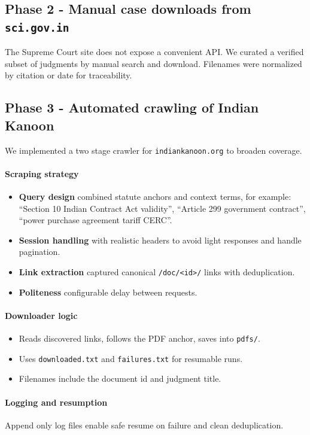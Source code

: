 \documentclass[11pt]{article}
\begin{document}
\subsection{Phase 2 - Manual case downloads from \texttt{sci.gov.in}}
The Supreme Court site does not expose a convenient API. We curated a verified subset of judgments by manual search and download. Filenames were normalized by citation or date for traceability.

\subsection{Phase 3 - Automated crawling of Indian Kanoon}
We implemented a two stage crawler for \texttt{indiankanoon.org} to broaden coverage.

\paragraph{Scraping strategy}
\begin{itemize}[leftmargin=1.2em]
  \item \textbf{Query design} combined statute anchors and context terms, for example: ``Section 10 Indian Contract Act validity'', ``Article 299 government contract'', ``power purchase agreement tariff CERC''.
  \item \textbf{Session handling} with realistic headers to avoid light responses and handle pagination.
  \item \textbf{Link extraction} captured canonical \texttt{/doc/<id>/} links with deduplication.
  \item \textbf{Politeness} configurable delay between requests.
\end{itemize}

\paragraph{Downloader logic}
\begin{itemize}[leftmargin=1.2em]
  \item Reads discovered links, follows the PDF anchor, saves into \texttt{pdfs/}.
  \item Uses \texttt{downloaded.txt} and \texttt{failures.txt} for resumable runs.
  \item Filenames include the document id and judgment title.
\end{itemize}

\paragraph{Logging and resumption}
Append only log files enable safe resume on failure and clean deduplication.
\end{document}
